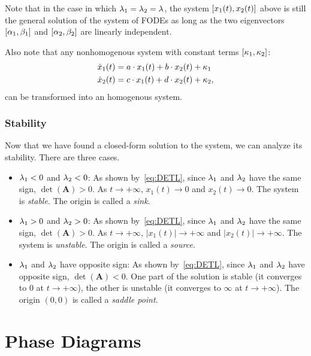 \documentclass[letterpaper,12pt,leqno]{article}
\begin{document}
Note that in the case in which $\lambda_{1}=\lambda_{2}=\lambda$, the system $\left[ x_{1}(t),x_{2}(t) \right]$ above is still the general solution of the system of FODEs as long as the two eigenvectors $\left[ \alpha_{1},\beta_{1} \right]$ and $\left[ \alpha_{2},\beta_{2} \right]$ are linearly independent.

Also note that any nonhomogenous system with constant terms $\left[ \kappa_{1},\kappa_{2} \right]$:
\begin{align*}
\dot{x}_{1}(t) &=a\cdot x_{1}(t)+b\cdot x_{2}(t)+\kappa_{1} \\
\dot{x}_{2}(t) &=c\cdot x_{1}(t)+d\cdot x_{2}(t)+\kappa_{2},
\end{align*}
can be transformed into an homogenous system.


\subsubsection{Stability}

Now that we have found a closed-form solution to the system, we can analyze its stability. There are three cases.

\begin{itemize}

\item  $\lambda_{1}<0$ and $\lambda_{2}<0$: As shown by~\eqref{eq:DETL}, since $\lambda_{1}$ and $\lambda_{2}$ have the same sign, $\det(\bm{A}) >0$. As $t\to +\infty$, $x_{1}(t)\to 0$ and $x_{2}(t)\to 0$. The system is \textit{stable}. The origin is called a \textit{sink}.

\item $\lambda_{1}>0$ and $\lambda_{2}>0$: As shown by~\eqref{eq:DETL}, since $\lambda_{1}$ and $\lambda_{2}$ have the same sign, $\det(\bm{A}) >0$. As $t\to +\infty$, $|x_{1}(t)|\to +\infty$ and $|x_{2}(t)|\to +\infty$. The system is \textit{unstable}. The origin is called a \textit{source}.

\item $\lambda_{1}$ and $\lambda_{2}$ have opposite sign: As shown by~\eqref{eq:DETL}, since $\lambda_{1}$ and $\lambda_{2}$ have opposite sign, $\det(\bm{A}) <0$. One part of the solution is stable (it converges to 0 at $t\to +\infty$), the other is unstable (it converges to $\infty$ at $t\to +\infty$). The origin $(0,0)$ is called a \textit{saddle point}.

\end{itemize}

\section{Phase Diagrams}\label{sec:three}
\end{document}
